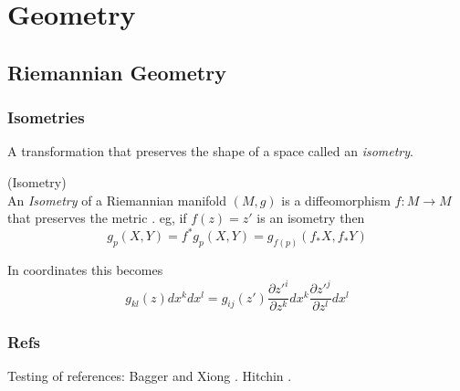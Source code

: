 \chapter{Geometry}

\section{Riemannian Geometry}
\subsection{Isometries}
A transformation that preserves the shape of a space called an \emph{isometry}.
\begin{definition}{(Isometry)}\\
An \emph{Isometry} of a Riemannian manifold $(M,g)$ is a diffeomorphism $f: M \rightarrow M$ that preserves the metric \citep{nakahara}. eg, if $f(z) = z'$ is an isometry then 
\[g_p(X,Y) = f^*g_p(X,Y) = g_{f(p)}(f_*X,f_*Y) \]
\end{definition}

In coordinates this becomes
\[g_{kl}(z) dx^k dx^l = g_{ij}(z') \frac{\partial {z'}^i}{\partial z^k} dx^k \frac{\partial {z'}^j}{\partial z^l} dx^l\]
\subsection{Refs}
Testing of references: 
Bagger and Xiong \citep{baggerxiong}. Hitchin \cite{hitchin}.


